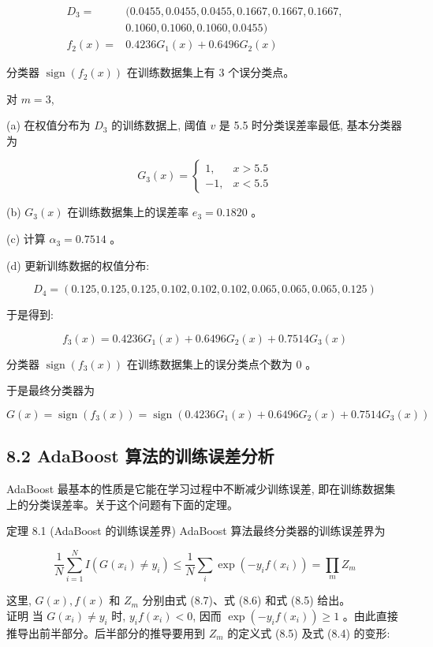 \documentclass[10pt]{article}
\begin{document}
$$
\begin{aligned}
D_{3}= & (0.0455,0.0455,0.0455,0.1667,0.1667,0.1667, \\
& 0.1060,0.1060,0.1060,0.0455) \\
f_{2}(x)= & 0.4236 G_{1}(x)+0.6496 G_{2}(x)
\end{aligned}
$$

分类器 $\operatorname{sign}\left(f_{2}(x)\right)$ 在训练数据集上有 3 个误分类点。

对 $m=3$,

(a) 在权值分布为 $D_{3}$ 的训练数据上, 阈值 $v$ 是 5.5 时分类误差率最低, 基本分类器为

$$
G_{3}(x)= \begin{cases}1, & x>5.5 \\ -1, & x<5.5\end{cases}
$$

(b) $G_{3}(x)$ 在训练数据集上的误差率 $e_{3}=0.1820$ 。

(c) 计算 $\alpha_{3}=0.7514$ 。

(d) 更新训练数据的权值分布:

$$
D_{4}=(0.125,0.125,0.125,0.102,0.102,0.102,0.065,0.065,0.065,0.125)
$$

于是得到:

$$
f_{3}(x)=0.4236 G_{1}(x)+0.6496 G_{2}(x)+0.7514 G_{3}(x)
$$

分类器 $\operatorname{sign}\left(f_{3}(x)\right)$ 在训练数据集上的误分类点个数为 0 。

于是最终分类器为

$$
G(x)=\operatorname{sign}\left(f_{3}(x)\right)=\operatorname{sign}\left(0.4236 G_{1}(x)+0.6496 G_{2}(x)+0.7514 G_{3}(x)\right)
$$

\subsection*{8.2 AdaBoost 算法的训练误差分析}
AdaBoost 最基本的性质是它能在学习过程中不断减少训练误差, 即在训练数据集上的分类误差率。关于这个问题有下面的定理。

定理 8.1 (AdaBoost 的训练误差界) AdaBoost 算法最终分类器的训练误差界为


\begin{equation*}
\frac{1}{N} \sum_{i=1}^{N} I\left(G\left(x_{i}\right) \neq y_{i}\right) \leqslant \frac{1}{N} \sum_{i} \exp \left(-y_{i} f\left(x_{i}\right)\right)=\prod_{m} Z_{m} \tag{8.9}
\end{equation*}


这里, $G(x), f(x)$ 和 $Z_{m}$ 分别由式 (8.7)、式 (8.6) 和式 (8.5) 给出。\\
证明 当 $G\left(x_{i}\right) \neq y_{i}$ 时, $y_{i} f\left(x_{i}\right)<0$, 因而 $\exp \left(-y_{i} f\left(x_{i}\right)\right) \geqslant 1$ 。由此直接推导出前半部分。后半部分的推导要用到 $Z_{m}$ 的定义式 (8.5) 及式 (8.4) 的变形:
\end{document}
